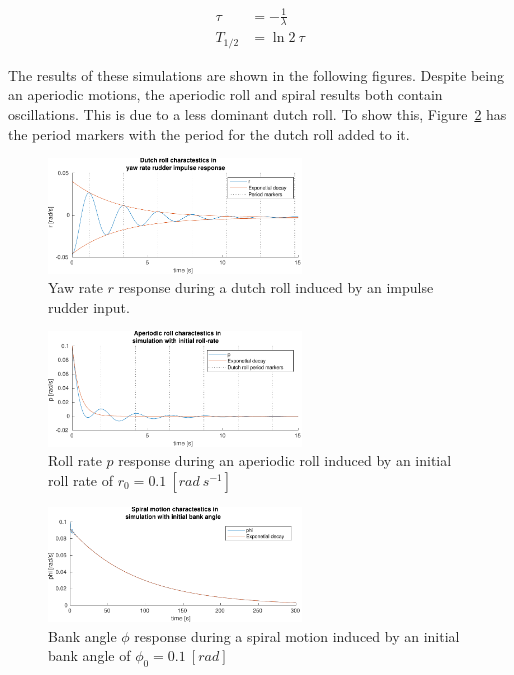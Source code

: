 \begin{align}
    \tau &= -\frac{1}{\lambda} \\
    T_{1/2} &= \ln{2}\ \tau
\end{align}

The results of these simulations are shown in the following figures. Despite being an aperiodic motions, the aperiodic roll and spiral results both contain oscillations. This is due to a less dominant dutch roll. To show this, Figure~\ref{fig:ol_apdsf} has the period markers with the period for the dutch roll added to it.

\begin{figure}[ht]
    \centering
    \includegraphics[width=0.6\textwidth]{figures/ol_dr}    
    \caption{Yaw rate $r$ response during a dutch roll induced by an impulse rudder input.}
    \label{fig:ol_dr}
\end{figure}

\begin{figure}[ht]
    \centering
    \includegraphics[width=0.6\textwidth]{figures/ol_ap}    
    \caption{Roll rate $p$ response during an aperiodic roll induced by an initial roll rate of $r_0=0.1\ 
    [rad\ s^{-1}]$}
    \label{fig:ol_apdsf}
\end{figure}

\begin{figure}[ht]
    \centering
    \includegraphics[width=0.6\textwidth]{figures/ol_si}    
    \caption{Bank angle $\phi$ response during a spiral motion induced by an initial bank angle of $\phi_0=0.1\ [rad]$}
    \label{fig:ol_si}
\end{figure}

\clearpage
